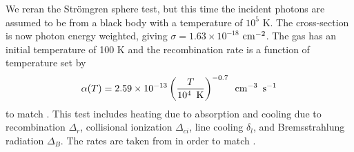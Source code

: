\documentclass[fleq,usenatbib]{mnras}
\newcommand{\strom}{Str\"omgren}
\begin{document}
{We reran the \strom{} sphere test, but this time the incident photons are 
assumed to be from a black body with a temperature of $10^5$ K. The 
cross-section is now photon energy weighted, giving 
$\sigma = 1.63 \times 10^{-18}$ $\rm cm^{-2}$. The gas has an initial 
temperature of 100 K and the recombination rate is a function of temperature 
set by
\begin{equation}
\alpha(T) = 2.59 \times 10^{-13} \left( \frac{T}{10^4 \hspace{5pt} 
{\rm K}}\right)^{-0.7} \hspace{5pt} {\rm cm}^{-3} \hspace{5pt} {\rm s}^{-1}
\end{equation}
to match \cite{petkovaSpringel09}. This test includes heating due to 
absorption and cooling due to recombination $\Delta_r$, collisional 
ionization $\Delta_{ci}$, line cooling $\delta_l$, and Bremsstrahlung 
radiation $\Delta_B$. The rates are taken from \cite{cen92} in order to
match \cite{petkovaSpringel09}.

}
\end{document}
